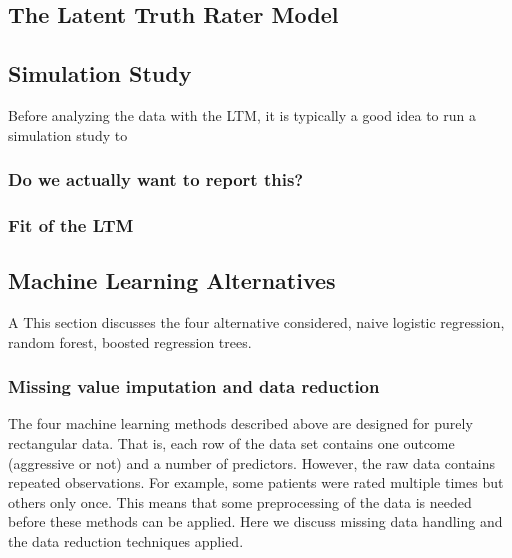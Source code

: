 \documentclass[a4paper,11pt]{article}
\begin{document}
\subsection{The Latent Truth Rater Model}

%

\subsection{Simulation Study}

Before analyzing the data with the LTM, it is typically a good idea to run a simulation study to

\subsubsection{Do we actually want to report this?}

\subsubsection{Fit of the LTM}



\subsection{Machine Learning Alternatives}
A
This section discusses the four alternative considered, naive logistic regression, random forest, boosted regression trees.


\subsubsection{Missing value imputation and data reduction}
The four machine learning methods described above are designed for purely rectangular data.
That is, each row of the data set contains one outcome (aggressive or not) and a number of predictors.
However, the raw data contains repeated observations.
For example, some patients were rated multiple times but others only once.
This means that some preprocessing of the data is needed before these methods can be applied.
Here we discuss missing data handling and the data reduction techniques applied.
\end{document}
